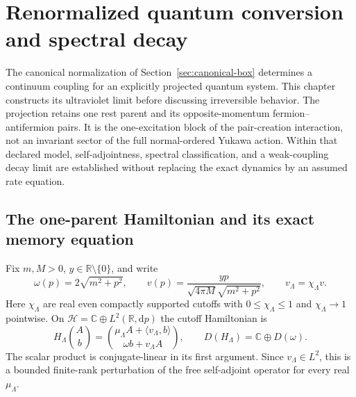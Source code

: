 \documentclass[11pt,a4paper,oneside]{book}
\theoremstyle{plain}
\theoremstyle{definition}
\theoremstyle{remark}
\newcommand{\R}{\mathbb R}
\newcommand{\C}{\mathbb C}
\newcommand{\dd}{\mathrm d}
\begin{document}
\chapter{Renormalized quantum conversion and spectral decay}
\label{ch:renormalized-conversion}
The canonical normalization of Section~\ref{sec:canonical-box} determines
a continuum coupling for an explicitly projected quantum system.  This
chapter constructs its ultraviolet limit before discussing irreversible
behavior.  The projection retains one rest parent and its opposite-momentum
fermion--antifermion pairs.  It is the one-excitation block of the
pair-creation interaction, not an invariant sector of the full
normal-ordered Yukawa action.  Within that declared model, self-adjointness,
spectral classification, and a weak-coupling decay limit are established
without replacing the exact dynamics by an assumed rate equation.

\section{The one-parent Hamiltonian and its exact memory equation}
\label{sec:one-parent-memory}
Fix $m,M>0$, $y\in\R\setminus\{0\}$, and write
\begin{equation}
 \omega(p)=2\sqrt{m^2+p^2},\qquad
 v(p)=\frac{yp}{\sqrt{4\pi M}\sqrt{m^2+p^2}},\qquad
 v_\Lambda=\chi_\Lambda v.
 \label{eq:one-parent-profile}
\end{equation}
Here $\chi_\Lambda$ are real even compactly supported cutoffs with
$0\le\chi_\Lambda\le1$ and $\chi_\Lambda\to1$ pointwise.  On
$\mathcal H=\C\oplus L^2(\R,\dd p)$ the cutoff Hamiltonian is
\begin{equation}
 H_\Lambda\binom A b=
 \binom{\mu_\Lambda A+\langle v_\Lambda,b\rangle}
       {\omega b+v_\Lambda A},
 \qquad D(H_\Lambda)=\C\oplus D(\omega).
 \label{eq:one-parent-cutoff}
\end{equation}
The scalar product is conjugate-linear in its first argument.  Since
$v_\Lambda\in L^2$, this is a bounded finite-rank perturbation of the
free self-adjoint operator for every real $\mu_\Lambda$.
\end{document}

